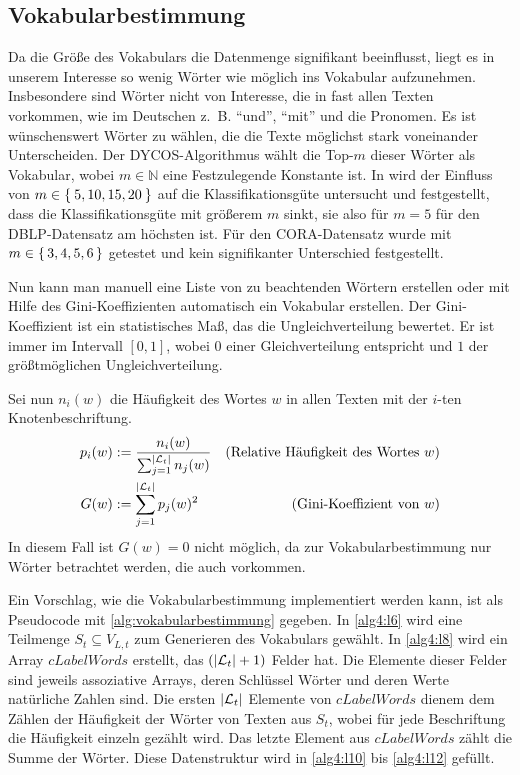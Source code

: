 \subsection{Vokabularbestimmung}\label{sec:vokabularbestimmung}
Da die Größe des Vokabulars die Datenmenge signifikant beeinflusst,
liegt es in unserem Interesse so wenig Wörter wie möglich ins
Vokabular aufzunehmen. Insbesondere sind Wörter nicht von Interesse,
die in fast allen Texten vorkommen, wie im Deutschen z.~B.
\enquote{und}, \enquote{mit} und die Pronomen. Es ist wünschenswert
Wörter zu wählen, die die Texte möglichst stark voneinander Unterscheiden.
Der DYCOS-Algorithmus wählt die Top-$m$ dieser Wörter als Vokabular,
wobei $m \in \mathbb{N}$ eine Festzulegende Konstante ist. In \cite[S. 365]{aggarwal2011}
wird der Einfluss von $m \in \Set{5,10, 15,20}$ auf die Klassifikationsgüte
untersucht und festgestellt, dass die Klassifikationsgüte mit größerem
$m$ sinkt, sie also für $m=5$ für den DBLP-Datensatz am höchsten ist.
Für den CORA-Datensatz wurde mit $m \in \set{3,4,5,6}$ getestet und
kein signifikanter Unterschied festgestellt.

Nun kann man manuell eine Liste von zu beachtenden Wörtern erstellen
oder mit Hilfe des Gini-Koeffizienten automatisch ein Vokabular erstellen.
Der Gini-Koeffizient ist ein statistisches Maß, das die Ungleichverteilung
bewertet. Er ist immer im Intervall $[0,1]$, wobei $0$ einer
Gleichverteilung entspricht und $1$ der größtmöglichen Ungleichverteilung.

Sei nun $n_i(w)$ die Häufigkeit des Wortes $w$ in allen Texten mit
der $i$-ten Knotenbeschriftung.
\begin{align}
    p_i(w) &:= \frac{n_i(w)}{\sum_{j=1}^{|\mathcal{L}_t|} n_j(w)} &\text{(Relative Häufigkeit des Wortes $w$)}\\
    G(w)   &:= \sum_{j=1}^{|\mathcal{L}_t|} p_j(w)^2              &\text{(Gini-Koeffizient von $w$)}
\end{align}
In diesem Fall ist $G(w)=0$ nicht möglich, da zur Vokabularbestimmung
nur Wörter betrachtet werden, die auch vorkommen.

Ein Vorschlag, wie die Vokabularbestimmung implementiert werden kann,
ist als Pseudocode mit \cref{alg:vokabularbestimmung}
gegeben. In \cref{alg4:l6} wird eine Teilmenge $S_t \subseteq V_{L,t}$
zum Generieren des Vokabulars gewählt. In \cref{alg4:l8} wird ein Array $cLabelWords$ erstellt, das $(|\mathcal{L}_t|+1)$ Felder hat.
Die Elemente dieser Felder sind jeweils assoziative Arrays, deren
Schlüssel Wörter und deren Werte natürliche Zahlen sind. Die ersten
$|\mathcal{L}_t|$ Elemente von $cLabelWords$ dienem dem Zählen der Häufigkeit
der Wörter von Texten aus $S_t$, wobei für jede Beschriftung die
Häufigkeit einzeln gezählt wird. Das letzte Element aus $cLabelWords$
zählt die Summe der Wörter. Diese Datenstruktur wird in
\cref{alg4:l10} bis \ref{alg4:l12} gefüllt.

